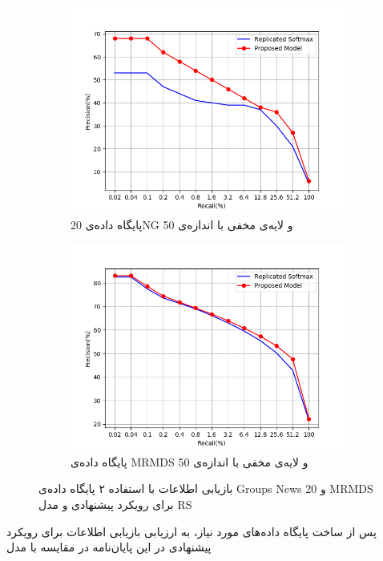 \begin{figure}[!b]
\begin{subfigure}{.47\textwidth}
		\includegraphics[scale = .5]{chap5-img/ir-5}
		\caption{پایگاه داده‌ی 20NG و لایه‌ی مخفی با اندازه‌ی 50}
		\label{chap5-fig7sub5}
	\end{subfigure}		
	\begin{subfigure}{.47\textwidth}
		\includegraphics[scale =.5]{chap5-img/ir-6}
		\caption{ پایگاه داده‌ی MRMDS و لایه‌ی مخفی با اندازه‌ی 50}
		\label{chap5-fig7sub6}
	\end{subfigure}
	\caption{بازیابی اطلاعات با استفاده ۲ پایگاه داده‌ی Groups News 20 و MRMDS برای رویکرد پیشنهادی و مدل RS}
	\label{chap5-fig7}
\end{figure}
پس از ساخت پایگاه داده‌های مورد نیاز، به ارزیابی بازیابی اطلاعات برای رویکرد پیشنهادی در این پایان‌نامه در مقایسه با مدل
